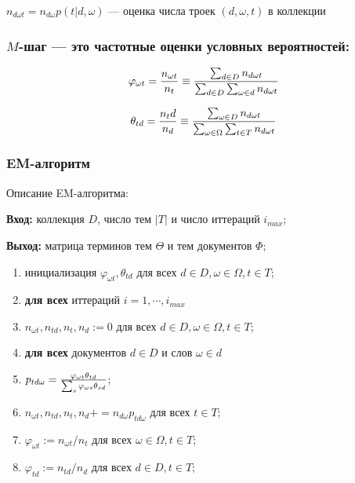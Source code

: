 \documentclass[10pt]{article}
\renewcommand{\phi}{\varphi}
\begin{document}
$n_{d \omega t} = n_{d \omega}p(t | d, \omega)$ --- оценка числа троек $(d, \omega, t)$ в коллекции


\subsubsection*{$M$-шаг --- это частотные оценки условных вероятностей:}

$$ \phi_{\omega t} = {{n_{\omega t}} \over {n_t}} \equiv {{\sum_{d \in D} n_{d \omega t}} \over {\sum_{d \in D} \sum_{\omega \in d} n_{d \omega t}}} $$

$$ \theta_{td} = { {n_td} \over {n_d}} \equiv {{\sum_{\omega \in D} n_{d \omega t}} \over {\sum_{\omega \in \Omega} \sum_{t \in T} n_{d \omega t}}}$$

\newpage
\subsubsection{EM-алгоритм}

Описание EM-алгоритма:

\textbf{Вход:} коллекция $D$, число тем $|T|$ и число иттераций $i_{max}$;
	
\textbf{Выход:} матрица терминов тем $\Theta$ и тем документов $\Phi$;

\begin{enumerate}
		\item инициализация $\phi_{\omega t}, \theta_{td}$ для всех $d \in D, \omega \in \Omega, t \in T$; 
		\item \textbf{для всех} иттераций $i=1, \cdots, i_{max}$ 
		\item \quad $n_{\omega t}, n_{td}, n_t, n_d := 0$ для всех $d \in D, \omega \in \Omega, t \in T$; 
		\item \quad \textbf{для всех} документов  $d \in D$ и слов $\omega \in d$
		\item \quad \quad $p_{td\omega} = {{\phi_{\omega t} \theta_{td}} \over {\sum_{s} \phi_{\omega s} \theta_{sd}}}$; 
		\item \quad \quad $n_{\omega t}, n_{td}, n_t, n_d += n_{d \omega} p_{td \omega}$ для всех $t \in T$;
		\item \quad $\phi_{\omega t} := n_{\omega t}/n_t$ для всех $\omega \in \Omega, t \in T$;
		\item \quad $\phi_{td} := n_{td}/n_d$ для всех $d \in D, t \in T$;

\end{enumerate}
\end{document}
